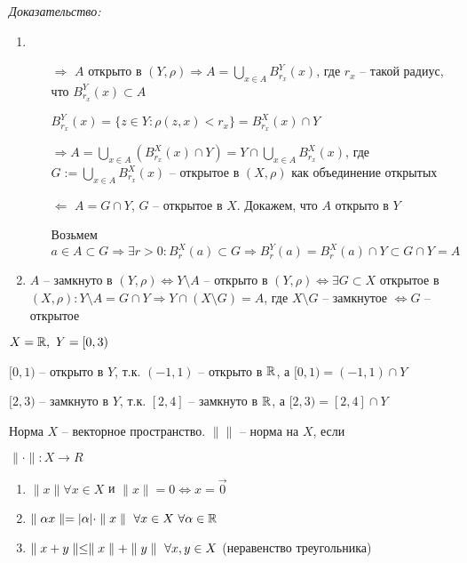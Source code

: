 \documentclass[12pt]{article}
\begin{document}
\textit{Доказательство:}

\begin{enumerate}
    \item 
    
    \begin{itemize}
        \item[$\Rightarrow$] $A$ открыто в $(Y, \rho) \Rightarrow A = \bigcup\limits_{x \in A} B^Y_{r_x}(x)$, где $r_x$ -- такой радиус, что $B^Y_{r_x}(x) \subset A$
        
        $B^Y_{r_x}(x) = \{z \in Y : \rho(z, x) < r_x\} = B^X_{r_x}(x) \cap Y$

        $\Rightarrow A = \bigcup\limits_{x \in A} (B^X_{r_x}(x) \cap Y) = Y \cap \bigcup\limits_{x \in A} B^X_{r_x}(x)$, где $G := \bigcup\limits_{x \in A} B^X_{r_x}(x)$ -- открытое в $(X, \rho)$ как объединение открытых

        \item[$\Leftarrow$] $A = G \cap Y$, $G$ -- открытое в $X$. Докажем, что $A$ открыто в $Y$
        
        Возьмем $a \in A \subset G \Rightarrow \exists r > 0 : B^X_r(a) \subset G \Rightarrow B^Y_r(a) = B^X_r(a) \cap Y \subset G \cap Y = A$
    \end{itemize}

    \item $A$ -- замкнуто в $(Y, \rho) \Leftrightarrow Y \setminus A$ -- открыто в $(Y, \rho) \Leftrightarrow \exists G \subset X$ открытое в \\ 
    $(X, \rho) : Y \setminus A = G \cap Y \Rightarrow Y \cap (X \setminus G) = A$, где $X \setminus G$ -- замкнутое $\Leftrightarrow G$ -- открытое 
\end{enumerate}

\begin{Example}{}
    $X = \mathbb R,\ Y = [0, 3)$

    $[0, 1)$ -- открыто в $Y$, т.к. $(-1, 1)$ -- открыто в $\mathbb R$, а $[0, 1) = (-1, 1) \cap Y$

    $[2, 3)$ -- замкнуто в $Y$, т.к. $[2, 4]$ -- замкнуто в $\mathbb R$, а $[2, 3) = [2, 4] \cap Y$
\end{Example}

\begin{defin}{Норма}
    $X$ -- векторное пространство. $\parallel \parallel$ -- норма на $X$, если 

    $\parallel \cdot \parallel : X \to R$

    \begin{enumerate}
        \item $\parallel x \parallel \forall x \in X$ и $\parallel x \parallel = 0 \Leftrightarrow x = \overrightarrow{0}$
        \item $\parallel \alpha x \parallel = |\alpha| \cdot \parallel x \parallel\ \forall x \in X\ \forall \alpha \in \mathbb R$
        \item $\parl{x + y} \leq \parl{x} + \parl{y}\ \forall x, y \in X$ (неравенство треугольника)
    \end{enumerate}
\end{defin}
\end{document}
